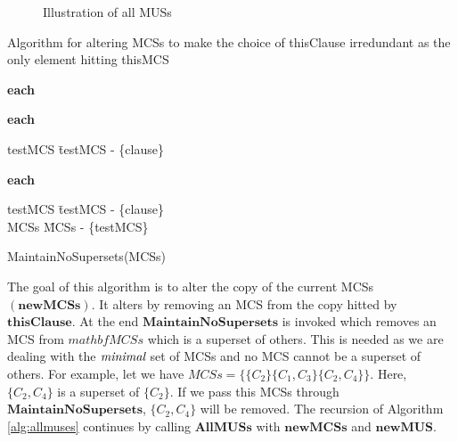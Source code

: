 \begin{figure}[htb] %
	\begin{center}
		
	\end{center}
	\caption{Illustration of all MUSs}
	\label{fig:graphallmuses}
\end{figure}
\begin{Algorithm}
	\caption{Algorithm for altering MCSs to make the choice of thisClause irredundant as the only element hitting thisMCS}
	\label{alg:propagatechoise}
	\begin{algorithm}{}{}
		\begin{FOR}{\textbf{each} }
			\begin{FOR}{\textbf{each} }
				\begin{IF}{}
					testMCS \= testMCS - \{clause\} \\
				\end{IF}
			\end{FOR}
		\end{FOR}
		\begin{FOR}{\textbf{each} }
			\begin{IF}{}
				testMCS \= testMCS - \{clause\} \\
				MCSs \= MCSs - \{testMCS\} \\
			\end{IF}
		\end{FOR}
		MaintainNoSupersets(MCSs)
	\end{algorithm}
\end{Algorithm}
The goal of this algorithm is to alter the copy of the current MCSs $(\mathbf{newMCSs})$. It alters by removing an MCS from the copy hitted by $\mathbf{thisClause}$. At the end $\mathbf{MaintainNoSupersets}$ is invoked which removes an MCS from $mathbf{MCSs}$ which is a superset of others. This is needed as we are dealing with the $\emph{minimal}$ set of MCSs and no MCS cannot be a superset of others. For example, let we have $MCSs=\{\{C_{2}\}\{C_{1}, C_{3}\}\{C_{2},C_{4}\}\}$. Here, $\{C_{2},C_{4}\}$ is a superset of $\{C_{2}\}$. If we pass this MCSs through $\mathbf{MaintainNoSupersets}$, $\{C_{2},C_{4}\}$ will be removed.\newline
The recursion of Algorithm \ref{alg:allmuses} continues by calling $\mathbf{AllMUSs}$ with $\mathbf{newMCSs}$ and $\mathbf{newMUS}$.
